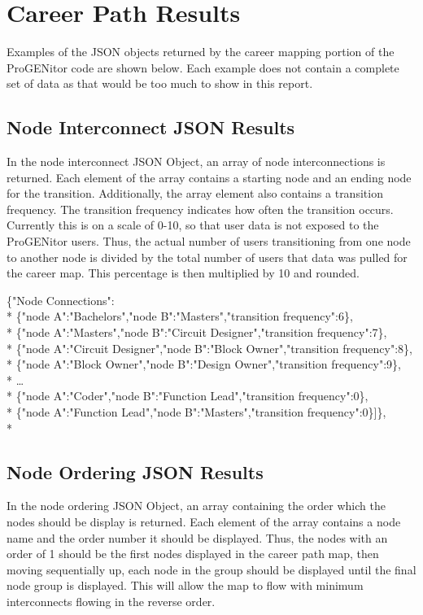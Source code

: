 \section{Career Path Results}
\label{sect:career-path-results}
Examples of the JSON objects returned by the career mapping portion of the
ProGENitor code are shown below.  Each example does not contain a complete set
of data as that would be too much to show in this report.

\subsection{Node Interconnect JSON Results}
In the node interconnect JSON Object, an array of node interconnections is
returned.  Each element of the array contains a starting node and an ending node
for the transition.  Additionally, the array element also contains a transition
frequency.  The transition frequency indicates how often the transition occurs. 
Currently this is on a scale of 0-10, so that user data is not exposed to the
ProGENitor users.  Thus, the actual number of users transitioning from one node
to another node is divided by the total number of users that data was pulled for
the career map.  This percentage is then multiplied by 10 and rounded.

\noindent\{"Node Connections":\\*
\{"node A":"Bachelors","node B":"Masters","transition frequency":6\},\\*
\{"node A":"Masters","node 	B":"Circuit Designer","transition frequency":7\},\\*
\{"node A":"Circuit Designer","node B":"Block 	Owner","transition
frequency":8\},\\* \{"node A":"Block Owner","node B":"Design Owner","transition
frequency":9\},\\*
\ldots\\* 
\{"node A":"Coder","node B":"Function Lead","transition frequency":0\},\\*
\{"node A":"Function Lead","node B":"Masters","transition frequency":0\}]\},\\*


\subsection{Node Ordering JSON Results}
In the node ordering JSON Object, an array containing the order which the nodes
should be display is returned.  Each element of the array contains a node name
and the order number it should be displayed.  Thus, the nodes with an order of
1 should be the first nodes displayed in the career path map, then
moving sequentially up, each node in the group should be displayed until the
final node group is displayed.  This will allow the map to flow with minimum
interconnects flowing in the reverse order.

